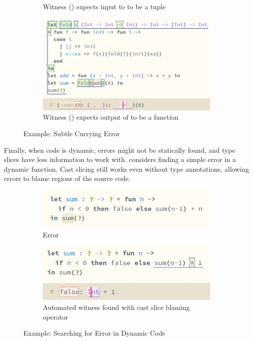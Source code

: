 \begin{figure}[h]
\begin{subfigure}{0.49\textwidth}
\caption{Witness (\code{[0]}) expects input to  to be a tuple}
\end{subfigure}
\begin{subfigure}{0.49\textwidth}
\includegraphics[width=1\textwidth]{Media/Figures/curries_expects_function}
\caption{Witness (\code{[0]}) expects output of  to be a function}
\end{subfigure}
\caption{Example: Subtle Currying Error}
\label{fig:TastyCurry}
\end{figure}

Finally, when code is dynamic, errors might not be statically found, and type slices have less information to work with.  considers finding a simple error in a dynamic function. Cast slicing still works even without type annotations, allowing errors to blame regions of the source code.
\begin{figure}[h]
\centering
\begin{subfigure}{0.45\textwidth}
\includegraphics[width=1\textwidth]{Media/Figures/dynamic_code_error}
\caption{Error}
\end{subfigure}
\begin{subfigure}{0.45\textwidth}
\includegraphics[width=1\textwidth]{Media/Figures/dynamic_code_error_cast_slice}
\caption{Automated witness found with cast slice blaming \code{+} operator}
\end{subfigure}
\caption{Example: Searching for Error in Dynamic Code}
\label{fig:DynamicExample}
\end{figure}



